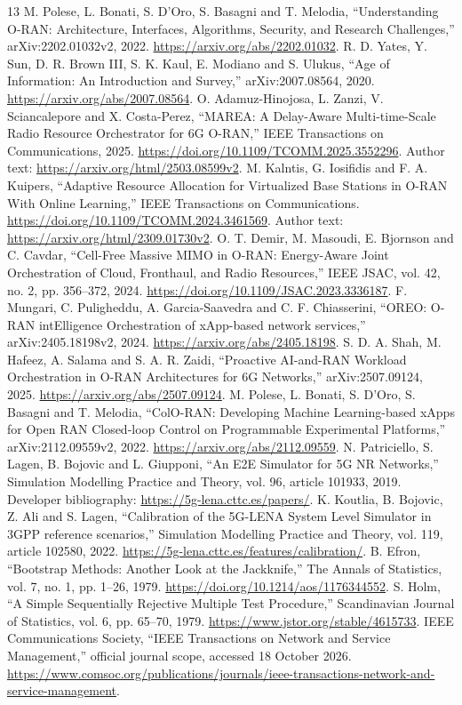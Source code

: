 \documentclass[10pt,a4paper]{article}
\begin{document}
\clearpage
\begin{thebibliography}{13}\small
{} M. Polese, L. Bonati, S. D'Oro, S. Basagni and T. Melodia,
``Understanding O-RAN: Architecture, Interfaces, Algorithms, Security, and Research Challenges,''
arXiv:2202.01032v2, 2022. \url{https://arxiv.org/abs/2202.01032}.
 R. D. Yates, Y. Sun, D. R. Brown III, S. K. Kaul, E. Modiano and S. Ulukus,
``Age of Information: An Introduction and Survey,'' arXiv:2007.08564, 2020.
\url{https://arxiv.org/abs/2007.08564}.
 O. Adamuz-Hinojosa, L. Zanzi, V. Sciancalepore and X. Costa-Perez,
``MAREA: A Delay-Aware Multi-time-Scale Radio Resource Orchestrator for 6G O-RAN,''
IEEE Transactions on Communications, 2025. \url{https://doi.org/10.1109/TCOMM.2025.3552296}.
Author text: \url{https://arxiv.org/html/2503.08599v2}.
 M. Kalntis, G. Iosifidis and F. A. Kuipers,
``Adaptive Resource Allocation for Virtualized Base Stations in O-RAN With Online Learning,''
IEEE Transactions on Communications. \url{https://doi.org/10.1109/TCOMM.2024.3461569}.
Author text: \url{https://arxiv.org/html/2309.01730v2}.
 O. T. Demir, M. Masoudi, E. Bjornson and C. Cavdar,
``Cell-Free Massive MIMO in O-RAN: Energy-Aware Joint Orchestration of Cloud, Fronthaul, and Radio Resources,''
IEEE JSAC, vol. 42, no. 2, pp. 356--372, 2024. \url{https://doi.org/10.1109/JSAC.2023.3336187}.
 F. Mungari, C. Puligheddu, A. Garcia-Saavedra and C. F. Chiasserini,
``OREO: O-RAN intElligence Orchestration of xApp-based network services,''
arXiv:2405.18198v2, 2024. \url{https://arxiv.org/abs/2405.18198}.
 S. D. A. Shah, M. Hafeez, A. Salama and S. A. R. Zaidi,
``Proactive AI-and-RAN Workload Orchestration in O-RAN Architectures for 6G Networks,''
arXiv:2507.09124, 2025. \url{https://arxiv.org/abs/2507.09124}.
 M. Polese, L. Bonati, S. D'Oro, S. Basagni and T. Melodia,
``ColO-RAN: Developing Machine Learning-based xApps for Open RAN Closed-loop Control on Programmable Experimental Platforms,''
arXiv:2112.09559v2, 2022. \url{https://arxiv.org/abs/2112.09559}.
 N. Patriciello, S. Lagen, B. Bojovic and L. Giupponi,
``An E2E Simulator for 5G NR Networks,'' Simulation Modelling Practice and Theory,
vol. 96, article 101933, 2019. Developer bibliography: \url{https://5g-lena.cttc.es/papers/}.
 K. Koutlia, B. Bojovic, Z. Ali and S. Lagen,
``Calibration of the 5G-LENA System Level Simulator in 3GPP reference scenarios,''
Simulation Modelling Practice and Theory, vol. 119, article 102580, 2022.
\url{https://5g-lena.cttc.es/features/calibration/}.
 B. Efron, ``Bootstrap Methods: Another Look at the Jackknife,''
The Annals of Statistics, vol. 7, no. 1, pp. 1--26, 1979.
\url{https://doi.org/10.1214/aos/1176344552}.
 S. Holm, ``A Simple Sequentially Rejective Multiple Test Procedure,''
Scandinavian Journal of Statistics, vol. 6, pp. 65--70, 1979.
\url{https://www.jstor.org/stable/4615733}.
 IEEE Communications Society, ``IEEE Transactions on Network and Service Management,''
official journal scope, accessed 18 October 2026.
\url{https://www.comsoc.org/publications/journals/ieee-transactions-network-and-service-management}.
\end{thebibliography}
\end{document}
